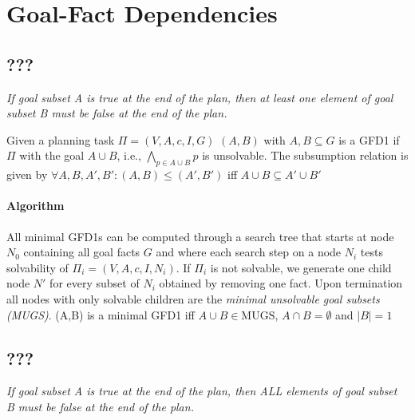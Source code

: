 \section{Goal-Fact Dependencies}


\subsection{???}


\emph{If goal subset A is true at the end of the plan, then at least one element of goal subset B
must be false at the end of the plan.}


\begin{definition}
Given a planning task $\Pi = (V,A,c,I,G)$ $(A,B)$ with $A, B \subseteq G$ is a 
GFD1 if $\Pi$ with the goal $A \cup B$, i.e., $\bigwedge_{p \in A \cup B} p$
is unsolvable.
The subsumption relation is given by $\forall A,B,A',B': (A,B) \leq (A',B')$ iff $A \cup B \subseteq 
A' \cup B'$
\end{definition}

\paragraph{Algorithm}
All minimal GFD1s can be computed through a search tree that starts at node $N_0$ containing
all goal facts $G$ and where each search step on a node $N_i$ tests solvability of 
$\Pi_i = (V,A,c,I,N_i)$. If $\Pi_i$ is not solvable, we generate one child 
node $N'$ for every subset of $N_i$ obtained by removing one fact.  
Upon termination all nodes with only solvable children are the \emph{minimal unsolvable 
goal subsets (MUGS)}. (A,B) is a minimal GFD1 iff $A \cup B \in \text{MUGS}$, 
$A \cap B = \emptyset$ and $|B| = 1$



\subsection{???}

\textit{If goal subset A is true at the end of the plan, 
then ALL elements of goal subset B must be false at the end of the plan.}\\

